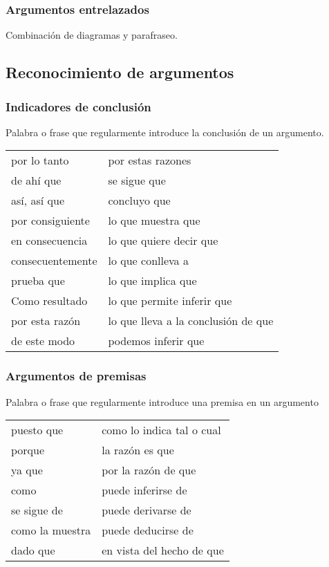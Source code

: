 \documentclass[10pt]{book} 						%
\begin{document}
\subsubsection{Argumentos entrelazados}
Combinación de diagramas y parafraseo.

\subsection{Reconocimiento de argumentos}
\subsubsection{Indicadores de conclusión}
Palabra o frase que regularmente introduce la conclusión de un argumento.
\begin{center}
\begin{tabular}{|l|l}
por lo tanto & por estas razones \\
de ahí que & se sigue que \\
así, así que & concluyo que \\
por consiguiente & lo que muestra que \\
en consecuencia &  lo que quiere decir que\\
consecuentemente & lo que conlleva a \\
prueba que & lo que implica que  \\
Como resultado & lo que permite inferir que  \\
por esta razón & lo que lleva a la conclusión de que  \\
de este modo & podemos inferir que \\
\end{tabular}
\end{center}
\subsubsection{Argumentos de premisas}
Palabra o frase que regularmente introduce una premisa en un argumento
\begin{center}
\begin{tabular}{|l|l}
 puesto que & como lo indica tal o cual  \\
porque & la razón es que \\
ya que & por la razón de que  \\
como & puede inferirse de \\
se sigue de  & puede derivarse de \\
como la muestra & puede deducirse de \\
dado que  & en vista del hecho de que 
\end{tabular}
\end{center}
\end{document}
